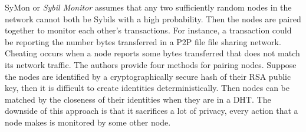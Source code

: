 SyMon\cite{jyothi2009symon} or \emph{Sybil Monitor} assumes that any two
sufficiently random nodes in the network cannot both be Sybils with a high
probability. Then the nodes are paired together to monitor each other's
transactions. For instance, a transaction could be reporting the number bytes
transferred in a P2P file file sharing network. Cheating occurs when a node
reports some bytes transferred that does not match its network traffic. The
authors provide four methods for pairing nodes. Suppose the nodes are identified
by a cryptographically secure hash of their RSA public key, then it is difficult
to create identities deterministically. Then nodes can be matched by the
closeness of their identities when they are in a DHT. The downside of this
approach is that it sacrifices a lot of privacy, every action that a node makes
is monitored by some other node.



